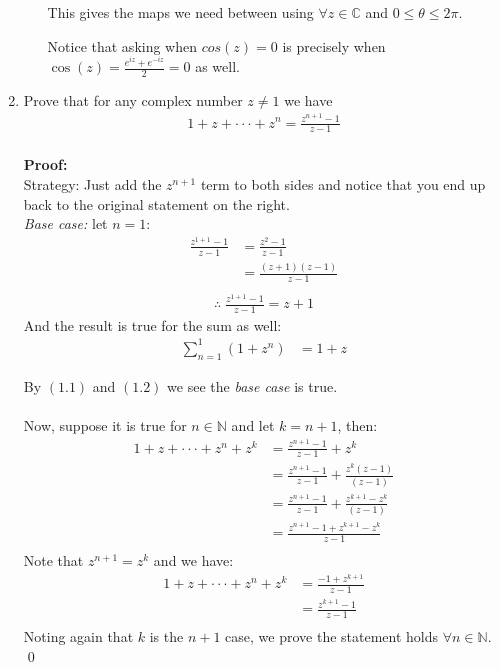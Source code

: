 \begin{enumerate}
\begin{enumerate}
		This gives the maps we need between using $\forall z \in \mathbb{C}$ and $0 \leq \theta \leq 2\pi$.

		Notice that asking when $cos(z) = 0$ is precisely when $\cos(z) = \frac{e^{iz} + e^{-iz}}{2} = 0$ as well.
		
	\end{enumerate}

	\item Prove that for any complex number $z \neq 1$ we have
	\begin{align*}
		1 + z + \cdot\cdot\cdot + z^n = \frac{z^{n + 1} - 1}{z - 1} \\
	\end{align*}

	\textbf{Proof:} \\
	Strategy: Just add the $z^{n + 1}$ term to both sides and notice that you end up back to the original statement on the right. \\

	\emph{Base case:} let $n = 1$:
	\begin{align*}
		\frac{z^{1 + 1} - 1}{z -1} &= \frac{z^2 - 1}{z - 1} \\
		&= \frac{(z + 1)(z - 1)}{z - 1} \\
	\end{align*}
	\begin{align}
		\therefore \; \frac{z^{1 + 1} - 1}{z -1} = z + 1
	\end{align}
	And the result is true for the sum as well:
	\begin{align}
		\sum_{n = 1}^{1} (1 + z^n) &= 1 + z
	\end{align}

	By $(1.1)$ and $(1.2)$ we see the \emph{base case} is true. \\
	\\
	Now, suppose it is true for $n \in \mathbb{N}$ and let $k = n + 1$, then:
	\begin{align*}
		1 + z + \cdot\cdot\cdot + z^n + z^k &= \frac{z^{n + 1} - 1}{z - 1} + z^k \\
		&= \frac{z^{n + 1} - 1}{z - 1} + \frac{z^k(z - 1)}{(z - 1)} \\
		&= \frac{z^{n + 1} - 1}{z - 1} + \frac{z^{k + 1} - z^k}{(z - 1)} \\
		&= \frac{z^{n + 1} - 1 + z^{k + 1} - z^k}{z - 1} \\ 
	\end{align*}
	Note that $z^{n + 1} = z^k$ and we have:
	\begin{align*}
		1 + z + \cdot\cdot\cdot + z^n + z^k &= \frac{ - 1 + z^{k + 1}}{z - 1} \\
		&= \frac{z^{k + 1} - 1}{z - 1} \\
	\end{align*}
	Noting again that $k$ is the $n + 1$ case, we prove the statement holds $\forall n \in \mathbb{N}.$
	\qed 


\end{enumerate}
